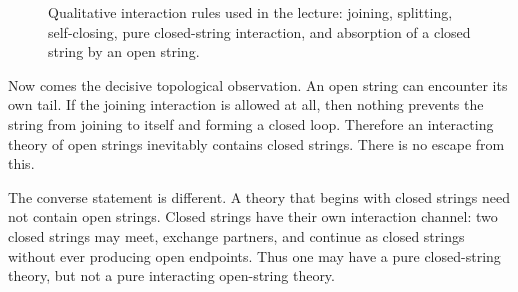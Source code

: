 \begin{figure}[t]
\centering
{}
\caption{Qualitative interaction rules used in the lecture: joining, splitting, self-closing, pure closed-string interaction, and absorption of a closed string by an open string.}
\end{figure}

Now comes the decisive topological observation. An open string can encounter its own tail. If the joining interaction is allowed at all, then nothing prevents the string from joining to itself and forming a closed loop. Therefore an interacting theory of open strings inevitably contains closed strings. There is no escape from this.

The converse statement is different. A theory that begins with closed strings need not contain open strings. Closed strings have their own interaction channel: two closed strings may meet, exchange partners, and continue as closed strings without ever producing open endpoints. Thus one may have a pure closed-string theory, but not a pure interacting open-string theory.

